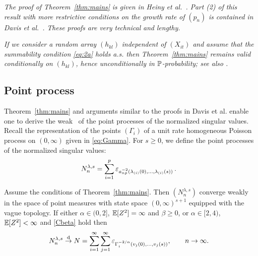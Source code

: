 \begin{remark}\em
The proof of Theorem~\ref{thm:mains} is given in Heiny et al.~\cite{heiny:mikosch:2016:noniid}. Part (2) of this  result
with more restrictive conditions on the growth rate of $(p_n)$ is contained in Davis et al.~\cite{davis:mikosch:pfaffel:2015}.
These proofs are very technical and lengthy.
\end{remark}
\begin{remark}\em
If we consider a random array $(h_{kl})$ independent of  $(X_{it})$ and
assume that the summability
condition \eqref{eq:2a} holds a.s.
then Theorem~\ref{thm:mains} remains valid conditionally on
$(h_{kl})$, hence  unconditionally in $\P$-probability; see also \cite{davis:mikosch:pfaffel:2015}.\end{remark}
\subsection{Point process \con }\label{sec:lkasfj}
Theorem~\ref{thm:mains}  and arguments similar to the proofs in Davis et al. \cite{davis:mikosch:pfaffel:2015}
enable one to derive the weak \con\ of
the point processes of the normalized singular values. Recall
the representation of the points $(\Gamma_i)$ of a unit rate homogeneous Poisson process on $(0,\infty)$
given in \eqref{eq:Gamma}. For $s\ge 0$, we define the point processes of the normalized singular values:
\begin{equation}\label{eq:ppdef}
N_n^{\lambda,s}=\sum_{i=1}^p \vep_{a_{np}^{-2}(\lambda_{(i)}(0),\ldots,\lambda_{(i)}(s))} \,.
\end{equation}

\begin{theorem}\label{cor:1ch3}
Assume the conditions of Theorem~\ref{thm:mains}.
Then $(N_n^{\lambda,s})$ converge weakly in the space of point measures
with state space $(0,\infty)^{s+1}$ equipped with the vague topology.
If either $\alpha \in (0,2]$, $\E[Z^2]=\infty$ and $\beta \ge 0$,
or $\alpha \in [2,4)$, $\E[Z^2]<\infty$ and \ref{Cbeta} hold then
\begin{equation}\label{eq:pp}
N_n^{\lambda,s} \cid N= \sum_{i=1}^\infty
\sum_{j=1}^{\infty} \vep_{\Gamma_i^{-2/\alpha} (v_j(0),\ldots,v_j(s))}, \qquad \nto.
\end{equation}
\end{theorem}

